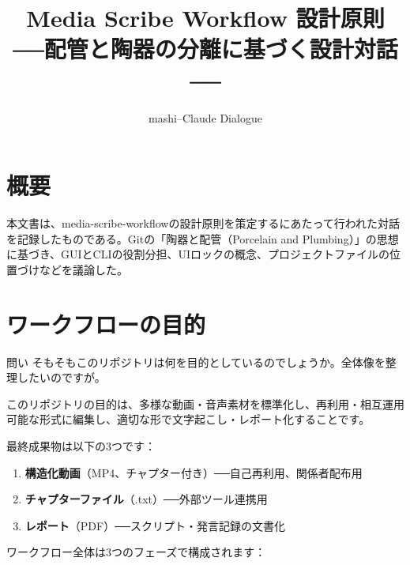 \documentclass[10pt,a4paper,twocolumn]{ltjsarticle}
\title{\textbf{Media Scribe Workflow 設計原則}\\
{\large ──配管と陶器の分離に基づく設計対話──}}
\author{mashi--Claude Dialogue}
\date{}
\begin{document}
\maketitle
\thispagestyle{firstpage}

\section*{概要}

本文書は、media-scribe-workflowの設計原則を策定するにあたって行われた対話を記録したものである。Gitの「陶器と配管（Porcelain and Plumbing）」の思想に基づき、GUIとCLIの役割分担、UIロックの概念、プロジェクトファイルの位置づけなどを議論した。

\section{ワークフローの目的}

\begin{itembox}[l]{問い}
そもそもこのリポジトリは何を目的としているのでしょうか。全体像を整理したいのですが。
\end{itembox}

このリポジトリの目的は、多様な動画・音声素材を標準化し、再利用・相互運用可能な形式に編集し、適切な形で文字起こし・レポート化することです。

最終成果物は以下の3つです：
\begin{enumerate}
\item \textbf{構造化動画}（MP4、チャプター付き）──自己再利用、関係者配布用
\item \textbf{チャプターファイル}（.txt）──外部ツール連携用
\item \textbf{レポート}（PDF）──スクリプト・発言記録の文書化
\end{enumerate}

ワークフロー全体は3つのフェーズで構成されます：

\vspace{0.5\baselineskip}
\vspace{0.5\baselineskip}
\end{document}
